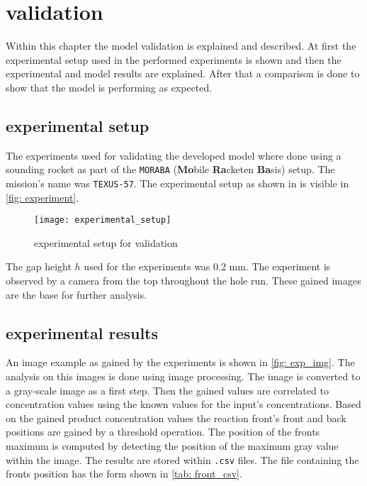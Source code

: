 \documentclass[../thesis.tex]{subfiles}
\begin{document}
\chapter{validation}
\label{chp:validation}

Within this chapter the model validation is explained and described. At first the experimental setup used in the performed experiments is shown and then the experimental and model results are explained. After that a comparison is done to show that the model is performing as expected.

\section{experimental setup}

The experiments used for validating the developed model where done using a sounding rocket as part of the \texttt{MORABA} (\textbf{Mo}bile \textbf{Ra}cketen \textbf{Ba}sis) \cite{stamminger2012moraba} setup. The mission's name was \texttt{TEXUS-57}. The experimental setup as shown in \cite{stergiou2022effects} is visible in \autoref{fig: experiment}.
\begin{figure}[htbp]
	\centering
	\texttt{[image: experimental\_setup]}
	\caption{experimental setup for validation}
	\label{fig: experiment}
\end{figure}
The gap height $h$ used for the experiments was 0.2 mm. The experiment is observed by a camera from the top throughout the hole run. These gained images are the base for further analysis.

\section{experimental results}

An image example as gained by the experiments is shown in \autoref{fig: exp_img}. The analysis on this images is done using image processing. The image is converted to a gray-scale image as a first step. Then the gained values are correlated to concentration values using the known values for the input's concentrations. Based on the gained product concentration values the reaction front's front and back positions are gained by a threshold operation. The position of the fronts maximum is computed by detecting the position of the maximum gray value within the image. The results are stored within \texttt{.csv} files. The file containing the fronts position has the form shown in \autoref{tab: front_csv}. 
\end{document}
